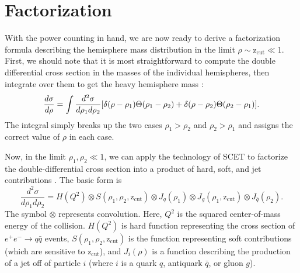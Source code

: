 \documentclass[../thesis.tex]{subfiles}
\providecommand{\zcut}{\mathrm{z_{cut}}}
\begin{document}
\section{Factorization}
	With the power counting in hand, we are now ready to derive a factorization formula describing the hemisphere mass distribution in the limit $\rho \sim \zcut \ll 1$. First, we should note that it is most straightforward to compute the double differential cross section in the masses of the individual hemispheres, then integrate over them to get the heavy hemisphere mass \cite{chien_resummation_2010}:
	\begin{equation}\label{factor-eq:heavy hemisphere cross section}
		\frac{d\sigma}{d\rho} = \int \frac{d^2\sigma}{d\rho_1d\rho_2}\qty[\delta(\rho - \rho_1)\Theta(\rho_1 - \rho_2) + \delta(\rho - \rho_2)\Theta(\rho_2 - \rho_1)].
	\end{equation}
	The integral simply breaks up the two cases $\rho_1 > \rho_2$ and $\rho_2 > \rho_1$ and assigns the correct value of $\rho$ in each case.

	Now, in the limit $\rho_1, \rho_2 \ll 1$, we can apply the technology of SCET to factorize the double-differential cross section into a product of hard, soft, and jet contributions \cite{frye_factorization_2016,ellis_jet_2010}. The basic form is
	\begin{equation}
		\frac{d^2\sigma}{d\rho_1 d\rho_2} = H(Q^2) \otimes S(\rho_1, \rho_2, \zcut) \otimes J_q(\rho_1) \otimes J_g(\rho_1, \zcut) \otimes J_{\bar q}(\rho_2).
	\end{equation}
	The symbol $\otimes$ represents convolution. Here, $Q^2$ is the squared center-of-mass energy of the collision. $H(Q^2)$ is hard function representing the cross section of $e^+ e^- \to q\bar{q}$ events, $S(\rho_1, \rho_2, \zcut)$ is the function representing soft contributions (which are sensitive to $\zcut$), and $J_i(\rho)$ is a function describing the production of a jet off of particle $i$ (where $i$ is a quark $q$, antiquark $\bar q$, or gluon $g$).
\end{document}
